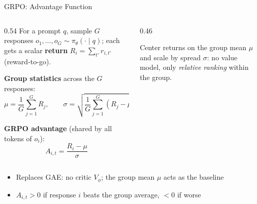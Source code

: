 \begin{frame}{GRPO: Advantage Function}
  \begin{columns}[T]
    \begin{column}{0.54\textwidth}
      For a prompt $q$, sample $G$ responses $o_1,\ldots,o_G \sim \pi_\theta(\cdot\mid q)$; each gets a scalar \textbf{return} $R_i = \sum_{t'} r_{i,t'}$ (reward-to-go).

      \vspace{0.4em}
      \textbf{Group statistics} across the $G$ responses:
      \[
        \mu = \frac{1}{G}\sum_{j=1}^{G} R_j, \qquad
        \sigma = \sqrt{\frac{1}{G}\sum_{j=1}^{G}(R_j-\mu)^2}
      \]

      \textbf{GRPO advantage} (shared by all tokens of $o_i$):
      \[
        \boxed{A_{i,t} = \frac{R_i - \mu}{\sigma}}
      \]
    \end{column}
    \begin{column}{0.46\textwidth}
      \centering

      \vspace{0.6em}
      {\footnotesize Center returns on the group mean $\mu$ and scale by spread $\sigma$: no value model, only \emph{relative ranking} within the group.}
    \end{column}
  \end{columns}

  \vspace{0.4em}
  \begin{itemize}[nosep]
    \item Replaces GAE: no critic $V_\phi$; the group mean $\mu$ acts as the baseline
    \item $A_{i,t} > 0$ if response $i$ beats the group average, $< 0$ if worse
  \end{itemize}
\end{frame}

